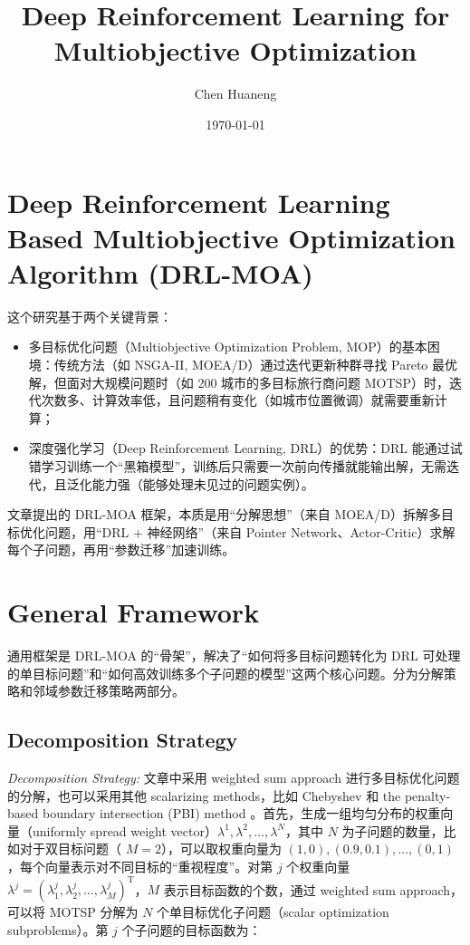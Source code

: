 \documentclass[fontset=none]{ctexart}
\title{Deep Reinforcement Learning for Multiobjective Optimization}
\author{Chen Huaneng}
\date{\today}
\begin{document}
\maketitle

\section{Deep Reinforcement Learning Based Multiobjective Optimization Algorithm (DRL-MOA)}

这个研究基于两个关键背景：

\begin{itemize}
    \item 多目标优化问题（Multiobjective Optimization Problem, MOP）的基本困境：传统方法（如 NSGA-II, MOEA/D）通过迭代更新种群寻找 Pareto 最优解，但面对大规模问题时（如 200 城市的多目标旅行商问题 MOTSP）时，迭代次数多、计算效率低，且问题稍有变化（如城市位置微调）就需要重新计算；
    \item 深度强化学习（Deep Reinforcement Learning, DRL）的优势：DRL 能通过试错学习训练一个“黑箱模型”，训练后只需要一次前向传播就能输出解，无需迭代，且泛化能力强（能够处理未见过的问题实例）。
\end{itemize}

文章\cite{liDeepReinforcementLearning2021}提出的 DRL-MOA 框架，本质是用“分解思想”（来自 MOEA/D\cite{zhangMOEAMultiobjectiveEvolutionary2007}）拆解多目标优化问题，用“DRL + 神经网络”（来自 Pointer Network\cite{vinyalsPointerNetworks2015}、Actor-Critic\cite{nazariReinforcementLearningSolving2018,belloNeuralCombinatorialOptimization2017}）求解每个子问题，再用“参数迁移”加速训练。

\section{General Framework}

通用框架是 DRL-MOA 的“骨架”，解决了“如何将多目标问题转化为 DRL 可处理的单目标问题”和“如何高效训练多个子问题的模型”这两个核心问题。分为分解策略和邻域参数迁移策略两部分。

\subsection{Decomposition Strategy}

\textit{Decomposition Strategy:} 文章中采用 weighted sum approach \cite{miettinen1999nonlinear} 进行多目标优化问题的分解，也可以采用其他 scalarizing methods，比如 Chebyshev 和 the penalty-based boundary intersection (PBI) method \cite{7572016,7390047}。首先，生成一组均匀分布的权重向量（uniformly spread weight vector）$\lambda^1, \lambda^2, \ldots, \lambda^N$，其中 $N$ 为子问题的数量，比如对于双目标问题（ $M = 2$），可以取权重向量为 $(1,0), (0.9,0.1), \ldots, (0,1)$，每个向量表示对不同目标的“重视程度”。对第 $j$ 个权重向量 $\lambda^j = (\lambda^j_1, \lambda^j_2, \ldots, \lambda^j_M)^{\mathrm{T}}$，$M$ 表示目标函数的个数，通过 weighted sum approach，可以将 MOTSP 分解为 $N$ 个单目标优化子问题（scalar optimization subproblems）。第 $j$ 个子问题的目标函数为：
\end{document}
